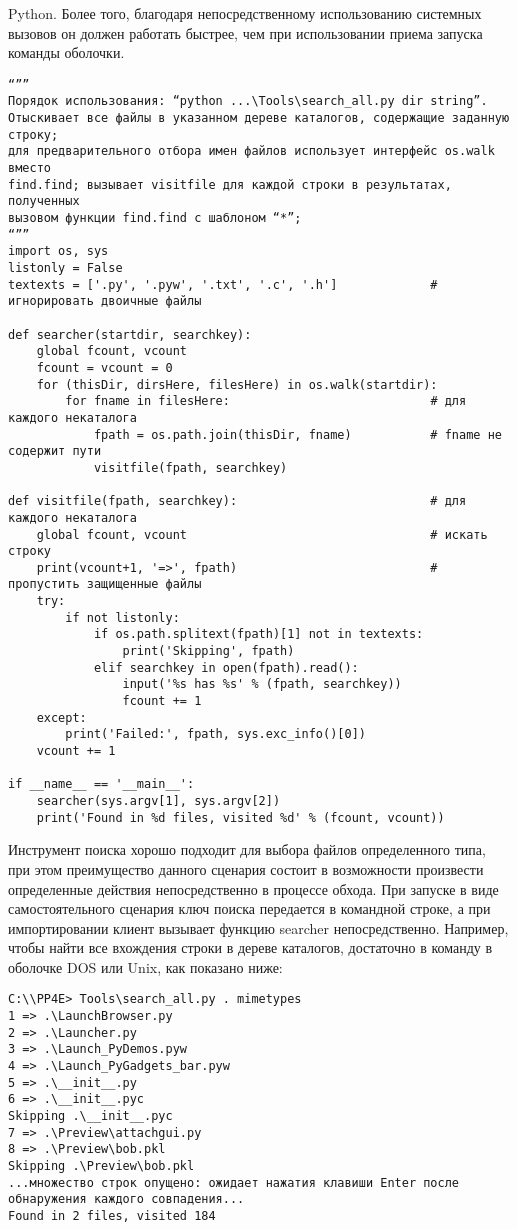\documentclass[12pt]{article}
\begin{document}
Python. Более того, благодаря непосредственному использованию системных вызовов он должен работать быстрее, чем при использовании
приема запуска команды оболочки.
\begin{verbatim}
“””
Порядок использования: “python ...\Tools\search_all.py dir string”.
Отыскивает все файлы в указанном дереве каталогов, содержащие заданную строку;
для предварительного отбора имен файлов использует интерфейс os.walk вместо
find.find; вызывает visitfile для каждой строки в результатах, полученных
вызовом функции find.find с шаблоном “*”;
“””
import os, sys
listonly = False
textexts = ['.py', '.pyw', '.txt', '.c', '.h']             # игнорировать двоичные файлы

def searcher(startdir, searchkey):
    global fcount, vcount
    fcount = vcount = 0
    for (thisDir, dirsHere, filesHere) in os.walk(startdir):
        for fname in filesHere:                            # для каждого некаталога
            fpath = os.path.join(thisDir, fname)           # fname не содержит пути
            visitfile(fpath, searchkey)

def visitfile(fpath, searchkey):                           # для каждого некаталога
    global fcount, vcount                                  # искать строку
    print(vcount+1, '=>', fpath)                           # пропустить защищенные файлы
    try:
        if not listonly:
            if os.path.splitext(fpath)[1] not in textexts:
                print('Skipping', fpath)
            elif searchkey in open(fpath).read():
                input('%s has %s' % (fpath, searchkey))
                fcount += 1
    except:
        print('Failed:', fpath, sys.exc_info()[0])
    vcount += 1

if __name__ == '__main__':
    searcher(sys.argv[1], sys.argv[2])
    print('Found in %d files, visited %d' % (fcount, vcount))
\end{verbatim}
Инструмент поиска хорошо подходит для выбора файлов определенного
типа, при этом преимущество данного сценария состоит в возможности
произвести определенные действия непосредственно в процессе обхода.
При запуске в виде самостоятельного сценария ключ поиска передается
в командной строке, а при импортировании клиент вызывает функцию
searcher непосредственно. Например, чтобы найти все вхождения строки в дереве каталогов, достаточно в команду в оболочке DOS
или Unix, как показано ниже:
\begin{verbatim}
C:\\PP4E> Tools\search_all.py . mimetypes
1 => .\LaunchBrowser.py
2 => .\Launcher.py
3 => .\Launch_PyDemos.pyw
4 => .\Launch_PyGadgets_bar.pyw
5 => .\__init__.py
6 => .\__init__.pyc
Skipping .\__init__.pyc
7 => .\Preview\attachgui.py
8 => .\Preview\bob.pkl
Skipping .\Preview\bob.pkl
...множество строк опущено: ожидает нажатия клавиши Enter после
обнаружения каждого совпадения...
Found in 2 files, visited 184
\end{verbatim}
\end{document}
